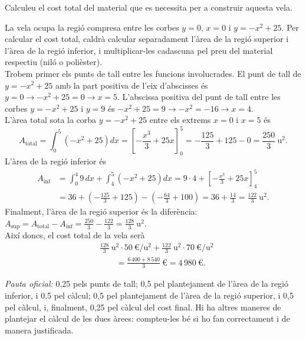 \begin{apartats}

Calculeu el cost total del material que es necessita per a construir aquesta vela.

\begin{solucio}
La vela ocupa la regió compresa entre les corbes $y=0$, $x=0$ i $y=-x^2+25$. Per calcular el cost total,
caldrà calcular separadament l'àrea de la regió superior i l'àrea de la regió inferior, i multiplicar-les
cadascuna pel preu del material respectiu (niló o polièster).\\
Trobem primer els punts de tall entre les funcions involucrades. El punt de tall de $y=-x^2+25$ amb la part
positiva de l'eix d'abscisses és $y=0\rightarrow-x^2+25=0\rightarrow x=5$. L'abscissa positiva del punt de
tall entre les corbes $y=-x^2+25$ i $y=9$ és $-x^2+25=9\rightarrow-x^2=-16\rightarrow x=4$.\\
L'àrea total sota la corba $y=-x^2+25$ entre els extrems $x=0$ i $x=5$ és
\[
A_{\text{total}}=\int_0^5\left(-x^2+25\right)dx=\left[-\frac{x^3}{3}+25x\right]_0^5=-\frac{125}{3}+125-0
=\frac{250}{3}\ \text{u}^2 .
\]
L'àrea de la regió inferior és
\begin{align*}
A_{\text{inf}}&=\int_0^4 9\,dx+\int_4^5\left(-x^2+25\right)dx=9\cdot4+\left[-\frac{x^3}{3}+25x\right]_4^5\\
&=36+\left(-\frac{125}{3}+125\right)-\left(-\frac{64}{3}+100\right)=36+\frac{14}{3}=\frac{122}{3}\ \text{u}^2 .
\end{align*}
Finalment, l'àrea de la regió superior és la diferència:
$A_{\text{sup}}=A_{\text{total}}-A_{\text{inf}}=\frac{250}{3}-\frac{122}{3}=\frac{128}{3}\ \text{u}^2$.\\
Així doncs, el cost total de la vela serà
\begin{align*}
&\frac{128}{3}\ \text{u}^2\cdot50\ \text{€}/\text{u}^2+\frac{122}{3}\ \text{u}^2\cdot70\ \text{€}/\text{u}^2\\
&\qquad=\frac{6\,400+8\,540}{3}\ \text{€}=4\,980\ \text{€}.
\end{align*}

\textit{Pauta oficial:} 0,25 pels punts de tall; 0,5 pel plantejament de l'àrea de la regió inferior, i 0,5
pel càlcul; 0,5 pel plantejament de l'àrea de la regió superior, i 0,5 pel càlcul, i, finalment, 0,25 pel
càlcul del cost final. Hi ha altres maneres de plantejar el càlcul de les dues àrees: compteu-les bé si ho
fan correctament i de manera justificada.
\end{solucio}

\end{apartats}
